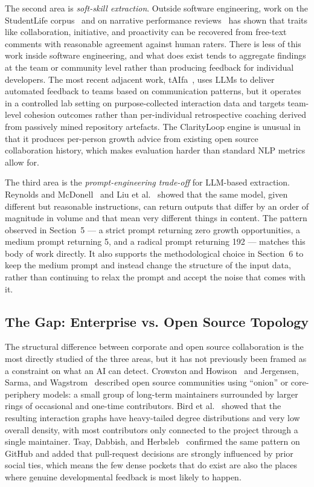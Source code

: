 \documentclass[conference]{IEEEconf}
\begin{document}
The second area is \textit{soft-skill extraction}. Outside software engineering, work on the StudentLife corpus~\cite{wang2014studentlife} and on narrative performance reviews~\cite{speer2021scoring} has shown that traits like collaboration, initiative, and proactivity can be recovered from free-text comments with reasonable agreement against human raters. There is less of this work inside software engineering, and what does exist tends to aggregate findings at the team or community level rather than producing feedback for individual developers. The most recent adjacent work, tAIfa~\cite{almutairi2025taifa}, uses LLMs to deliver automated feedback to teams based on communication patterns, but it operates in a controlled lab setting on purpose-collected interaction data and targets team-level cohesion outcomes rather than per-individual retrospective coaching derived from passively mined repository artefacts. The ClarityLoop engine is unusual in that it produces per-person growth advice from existing open source collaboration history, which makes evaluation harder than standard NLP metrics allow for.

The third area is the \textit{prompt-engineering trade-off} for LLM-based extraction. Reynolds and McDonell~\cite{reynolds2021prompt} and Liu et al.~\cite{liu2023pretrain} showed that the same model, given different but reasonable instructions, can return outputs that differ by an order of magnitude in volume and that mean very different things in content. The pattern observed in Section~5 --- a strict prompt returning zero growth opportunities, a medium prompt returning 5, and a radical prompt returning 192 --- matches this body of work directly. It also supports the methodological choice in Section~6 to keep the medium prompt and instead change the structure of the input data, rather than continuing to relax the prompt and accept the noise that comes with it.

\subsection{The Gap: Enterprise vs. Open Source Topology}
The structural difference between corporate and open source collaboration is the most directly studied of the three areas, but it has not previously been framed as a constraint on what an AI can detect. Crowston and Howison~\cite{crowston2005social} and Jergensen, Sarma, and Wagstrom~\cite{jergensen2011onion} described open source communities using ``onion'' or core-periphery models: a small group of long-term maintainers surrounded by larger rings of occasional and one-time contributors. Bird et al.~\cite{bird2008latent} showed that the resulting interaction graphs have heavy-tailed degree distributions and very low overall density, with most contributors only connected to the project through a single maintainer. Tsay, Dabbish, and Herbsleb~\cite{tsay2014influence} confirmed the same pattern on GitHub and added that pull-request decisions are strongly influenced by prior social ties, which means the few dense pockets that do exist are also the places where genuine developmental feedback is most likely to happen.
\end{document}
